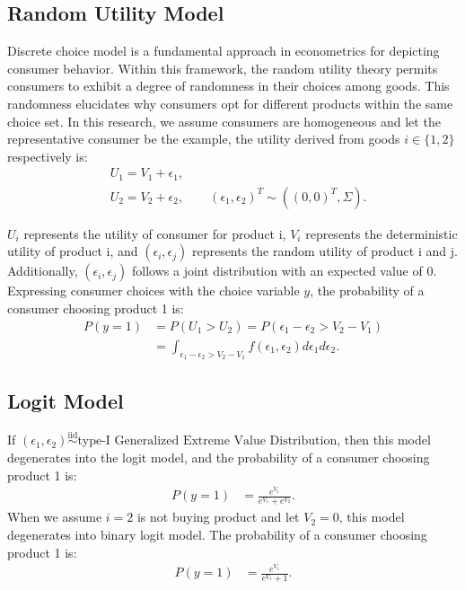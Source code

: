 \documentclass[12pt]{article}
\theoremstyle{definition}
\begin{document}
\begin{sloppypar}
\subsection{Random Utility Model}
Discrete choice model is a fundamental approach in econometrics for depicting consumer behavior. Within this framework, the random utility theory permits consumers to exhibit a degree of randomness in their choices among goods. This randomness elucidates why consumers opt for different products within the same choice set. In this research, we assume consumers are homogeneous and let the representative consumer be the example, the utility derived from goods $i \in \{1, 2\}$ respectively is:
\begin{align*}
    &U_{1} = V_{1} + \epsilon_{1},\\
    &U_{2} = V_{2} + \epsilon_{2}, \qquad (\epsilon_{1}, \epsilon_{2})^T \sim ((0,0)^T, \Sigma).
\end{align*}

$U_{i}$ represents the utility of consumer for product i, $V_{i}$ represents the deterministic utility of product i, and $(\epsilon_{i}, \epsilon_{j})$ represents the random utility of product i and j. Additionally, $(\epsilon_{i}, \epsilon_{j})$ follows a joint distribution with an expected value of 0. Expressing consumer choices with the choice variable $y$, the probability of a consumer choosing product 1 is:
\begin{align*}
    P(y=1) &= P(U_{1} > U_{2}) = P(\epsilon_{1} - \epsilon_{2} > V_{2} - V_{1}) \\ 
    &= \int_{\epsilon_{1} - \epsilon_{2} > V_{2} - V_{1}} f(\epsilon_{1}, \epsilon_{2}) d\epsilon_{1} d\epsilon_{2}.
\end{align*}

\subsection{Logit Model}
If $(\epsilon_{1}, \epsilon_{2}) \overset{\mathrm{iid}}{\sim} \text{type-I Generalized Extreme Value Distribution}$, then this model degenerates into the logit model, and the probability of a consumer choosing product 1 is:
\begin{align*}
    P(y=1) &= \frac{e^{V_{1}}}{e^{V_{1}} + e^{V_{2}}}.
\end{align*}
When we assume $i=2$ is not buying product and let $V_{2}=0$, this model degenerates into binary logit model. The probability of a consumer choosing product 1 is:
\begin{align*}
    P(y=1) &= \frac{e^{V_{1}}}{e^{V_{1}} + 1}.
\end{align*}


\end{sloppypar}
\end{document}
